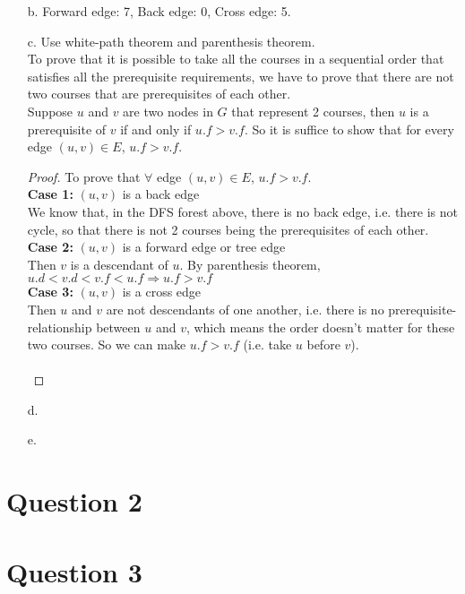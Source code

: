\documentclass[10pt]{article}
\begin{document}
\begin{itemize}
\item[b.] Forward edge: 7, Back edge: 0, Cross edge: 5.
\item[c.] Use white-path theorem and parenthesis theorem.\\
To prove that it is possible to take all the courses
in a sequential order that satisfies all the prerequisite requirements, we have to prove that there are not two courses that are prerequisites of each other. \\
Suppose $u$ and $v$ are two nodes in $G$ that represent 2 courses, then $u$ is a prerequisite of $v$ if and only if $u.f>v.f$. So it is suffice to show that for every edge $(u,v)\in E$, $u.f>v.f$.\\
\begin{proof} To prove that $\forall$ edge $(u,v)\in E$, $u.f>v.f$.\\
\textbf{Case 1:} $(u, v)$ is a back edge\\
We know that, in the DFS forest above, there is no back edge, i.e. there is not cycle, so that there is not 2 courses being the prerequisites of each other.\\
\textbf{Case 2:} $(u,v)$ is a forward edge or tree edge\\
Then $v$ is a descendant of $u$. By parenthesis theorem, $u.d<v.d<v.f<u.f\Rightarrow u.f>v.f$\\
\textbf{Case 3:} $(u,v)$ is a cross edge\\
Then $u$ and $v$ are not descendants of one another, i.e. there is no prerequisite-relationship between $u$ and $v$, which means the order doesn't matter for these two courses. So we can make $u.f>v.f$ (i.e. take $u$ before $v$).\\
\\
\end{proof}
\item[d.]
\item[e.]
\end{itemize}

\section*{Question 2}


\section*{Question 3}
\end{document}
